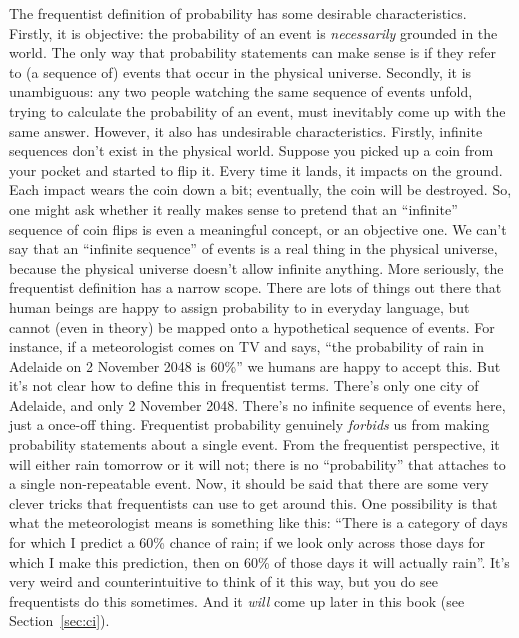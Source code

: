 The frequentist definition of probability has some desirable characteristics. Firstly, it is objective: the probability of an event is {\it necessarily} grounded in the world. The only way that probability statements can make sense is if they refer to (a sequence of) events that occur in the physical universe. Secondly, it is unambiguous: any two people watching the same sequence of events unfold, trying to calculate the probability of an event, must inevitably come up with the same answer. However, it also has undesirable characteristics. Firstly, infinite sequences don't exist in the physical world. Suppose you picked up a coin from your pocket and started to flip it. Every time it lands, it impacts on the ground. Each impact wears the coin down a bit; eventually, the coin will be destroyed. So, one might ask whether it really makes sense to pretend that an ``infinite'' sequence of coin flips is even a meaningful concept, or an objective one. We can't say that an ``infinite sequence'' of events is a real thing in the physical universe, because the physical universe doesn't allow infinite anything.  More seriously, the frequentist definition has a narrow scope. There are lots of things out there that human beings are happy to assign probability to in everyday language, but cannot (even in theory) be mapped onto a hypothetical sequence of events. For instance, if a meteorologist comes on TV and says, ``the probability of rain in Adelaide on 2 November 2048 is 60\%'' we humans are happy to accept this. But it's not clear how to define this in frequentist terms. There's only one city of Adelaide, and only 2 November 2048. There's no infinite sequence of events here, just a once-off thing. Frequentist probability genuinely {\it forbids} us from making probability statements about a single event. From the frequentist perspective, it will either rain tomorrow or it will not; there is no ``probability'' that attaches to a single non-repeatable event. Now, it should be said that there are some very clever tricks that frequentists can use to get around this. One possibility is that what the meteorologist means is something like this: ``There is a category of days for which I predict a 60\% chance of rain; if we look only across those days for which I make this prediction, then on 60\% of those days it will actually rain''. It's very weird and counterintuitive to think of it this way, but you do see frequentists do this sometimes. And it {\it will} come up later in this book (see Section~\ref{sec:ci}).

